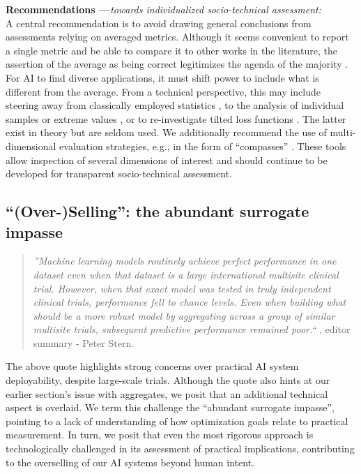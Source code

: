 \documentclass[manuscript,screen,authorversion,nonacm]{acmart}
\begin{document}
\noindent \textbf{Recommendations ---}\textit{towards individualized socio-technical assessment:} \\
A central recommendation is to avoid drawing general conclusions from assessments relying on averaged metrics. Although it seems convenient to report a single metric and be able to compare it to other works in the literature, the assertion of the average as being correct legitimizes the agenda of the majority \cite{Hermens1958TyrannyMajority}. For AI to find diverse applications, it must shift power to include what is different from the average. From a technical perspective, this may include steering away from classically employed statistics \cite{VonMises1964Statistics}, to the analysis of individual samples or extreme values \cite{Boult2019LearningUnknown}, or to re-investigate tilted loss functions \cite{Li2023TiltedLosses}. The latter exist in theory but are seldom used. We additionally recommend the use of multi-dimensional evaluation strategies, e.g., in the form of ``compasses'' \cite{ghosh2024simp,Mundt2022ClevaCompass}. These tools allow inspection of several dimensions of interest and should continue to be developed for transparent socio-technical assessment.


\subsection{``(Over-)Selling'': the abundant surrogate impasse}
\begin{quote}
    \emph{''Machine learning models routinely achieve perfect performance in one dataset even when that dataset is a large international multisite clinical trial. However, when that exact model was tested in truly independent clinical trials, performance fell to chance levels. Even when building what should be a more robust model by aggregating across a group of similar multisite trials, subsequent predictive performance remained poor.``} \citet{Chekroud2024IllusoryGeneralizabilityMedical}, editor summary - Peter Stern.
\end{quote}

\noindent The above quote highlights strong concerns over practical AI system deployability, despite large-scale trials. Although the quote also hints at our earlier section's issue with aggregates, we posit that an additional technical aspect is overlaid. We term this challenge the ``abundant surrogate impasse'', pointing to a lack of understanding of how optimization goals relate to practical measurement. In turn, we posit that even the most rigorous approach is technologically challenged in its assessment of practical implications, contributing to the overselling of our AI systems beyond human intent.
\end{document}
